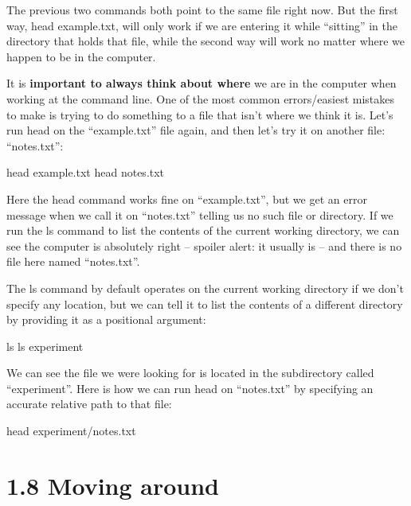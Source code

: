 \documentclass[
]{book}
\newenvironment{Shaded}{\begin{snugshade}}{\end{snugshade}}
\newcommand{\FunctionTok}[1]{\textcolor[rgb]{0.00,0.00,0.00}{#1}}
\newcommand{\NormalTok}[1]{#1}
\begin{document}
The previous two commands both point to the same file right now. But the first way, head example.txt, will only work if we are entering it while ``sitting'' in the directory that holds that file, while the second way will work no matter where we happen to be in the computer.

It is \textbf{important to always think about where} we are in the computer when working at the command line. One of the most common errors/easiest mistakes to make is trying to do something to a file that isn't where we think it is. Let's run head on the ``example.txt'' file again, and then let's try it on another file: ``notes.txt'':

\begin{Shaded}
\begin{Highlighting}[]
\FunctionTok{head}\NormalTok{ example.txt}
\FunctionTok{head}\NormalTok{ notes.txt}
\end{Highlighting}
\end{Shaded}

Here the head command works fine on ``example.txt'', but we get an error message when we call it on ``notes.txt'' telling us no such file or directory. If we run the ls command to list the contents of the current working directory, we can see the computer is absolutely right -- spoiler alert: it usually is -- and there is no file here named ``notes.txt''.

The ls command by default operates on the current working directory if we don't specify any location, but we can tell it to list the contents of a different directory by providing it as a positional argument:

\begin{Shaded}
\begin{Highlighting}[]
    \FunctionTok{ls}
    \FunctionTok{ls}\NormalTok{ experiment}
\end{Highlighting}
\end{Shaded}

We can see the file we were looking for is located in the subdirectory called ``experiment''. Here is how we can run head on ``notes.txt'' by specifying an accurate relative path to that file:

\begin{Shaded}
\begin{Highlighting}[]
    \FunctionTok{head}\NormalTok{ experiment/notes.txt}
\end{Highlighting}
\end{Shaded}

\hypertarget{moving-around}{%
\section{1.8 Moving around}\label{moving-around}}
\end{document}
